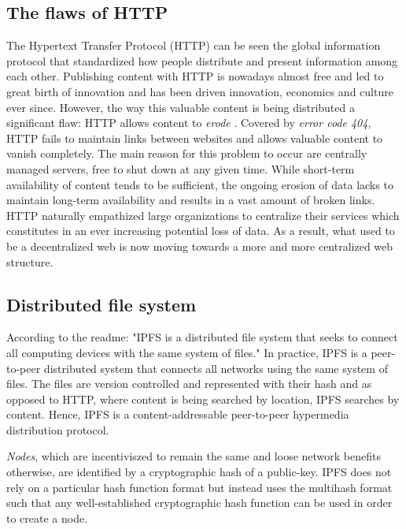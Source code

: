\documentclass[conference]{IEEEtran}
\begin{document}
\subsection{The flaws of HTTP}
The Hypertext Transfer Protocol (HTTP) can be seen the global information protocol that standardized how people distribute and present information among each other.
Publishing content with HTTP is nowadays almost free and led to great birth of innovation and has been driven innovation, economics and culture ever since.
However, the way this valuable content is being distributed a significant flaw: HTTP allows content to \textit{erode} \cite{http-obsolete}.
Covered by \textit{error code 404}\cite{http-rfc}, HTTP fails to maintain links between websites and allows valuable content to vanish completely.
The main reason for this problem to occur are centrally managed servers, free to shut down at any given time.
While short-term availability of content tends to be sufficient, the ongoing erosion of data lacks to maintain long-term availability and results in a vast amount of broken links\cite{broken-links}.
HTTP naturally empathized large organizations to centralize their services which constitutes in an ever increasing potential loss of data.
As a result, what used to be a decentralized web is now moving towards a more and more centralized web structure.

\subsection{Distributed file system}
\label{subsec:ipfs-dfs}
According to the readme\cite{ipfs-github}: "IPFS is a distributed file system that seeks to connect all computing devices with the same system of files."
In practice, IPFS is a peer-to-peer distributed system that connects all networks using the same system of files. 
The files are version controlled and represented with their hash and as opposed to HTTP, where content is being searched by location, IPFS searches by content.
Hence, IPFS is a content-addressable peer-to-peer hypermedia distribution protocol.

\textit{Nodes}, which are incentiviszed to remain the same and loose network benefits otherwise, are identified by a cryptographic hash of a public-key.
IPFS does not rely on a particular hash function format but instead uses the multihash\cite{multihash} format such that any well-established cryptographic hash function can be used in order to create a node.
\end{document}
